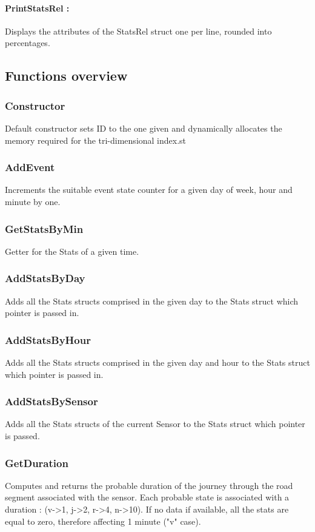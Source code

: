 \documentclass[10pt]{article}
\begin{document}
\paragraph{PrintStatsRel :}
Displays the attributes of the StatsRel struct one per line, rounded into percentages.

\subsection{Functions overview}

\subsubsection*{Constructor}
Default constructor sets ID to the one given and dynamically allocates the memory required for the tri-dimensional index.st

\subsubsection*{AddEvent}
Increments the suitable event state counter for a given day of week, hour and minute by one.

\subsubsection*{GetStatsByMin}
Getter for the Stats of a given time.

\subsubsection*{AddStatsByDay}
Adds all the Stats structs comprised in the given day to the Stats struct which pointer is passed in.

\subsubsection*{AddStatsByHour}
Adds all the Stats structs comprised in the given day and hour to the Stats struct which pointer is passed in.

\subsubsection*{AddStatsBySensor}
Adds all the Stats structs of the current Sensor to the Stats struct which pointer is passed.

\subsubsection*{GetDuration}
Computes and returns the probable duration of the journey through the road segment associated with the sensor. Each probable state is associated with a duration : (v->1, j->2, r->4, n->10). If no data if available, all the stats are equal to zero, therefore affecting 1 minute ("v" case).
\end{document}
